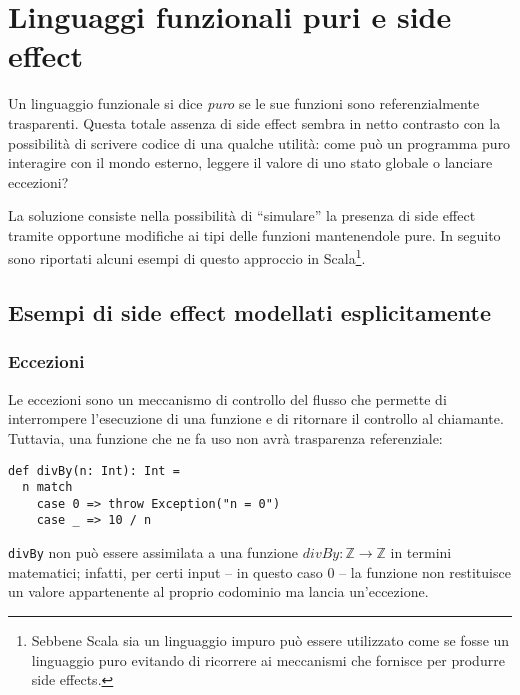 \section{Linguaggi funzionali puri e side effect}
\label{linguaggi-funzionali-puri-e-side-effect}

Un linguaggio funzionale si dice \emph{puro} se le sue funzioni sono referenzialmente trasparenti.
Questa totale assenza di side effect sembra in netto contrasto con la possibilità di scrivere codice di una qualche utilità: come può un programma puro interagire con il mondo esterno, leggere il valore di uno stato globale o lanciare eccezioni?

La soluzione consiste nella possibilità di ``simulare'' la presenza di side effect tramite opportune modifiche ai tipi delle funzioni mantenendole pure.
In seguito sono riportati alcuni esempi di questo approccio in Scala\footnote{Sebbene Scala sia un linguaggio impuro può essere utilizzato come se fosse un linguaggio puro evitando di ricorrere ai meccanismi che fornisce per produrre side effects.}.

\subsection{Esempi di side effect modellati esplicitamente}
\subsubsection{Eccezioni}
\label{eccezioni}
Le eccezioni sono un meccanismo di controllo del flusso che permette di interrompere l'esecuzione di una funzione e di ritornare il controllo al chiamante.
Tuttavia, una funzione che ne fa uso non avrà trasparenza referenziale:
\begin{lstlisting}[language=scala3]
def divBy(n: Int): Int =
  n match
    case 0 => throw Exception("n = 0")
    case _ => 10 / n
\end{lstlisting}
\lstinline|divBy| non può essere assimilata a una funzione $divBy : \mathbb{Z} \rightarrow \mathbb{Z}$ in termini matematici; infatti, per certi input -- in questo caso 0 -- la funzione non restituisce un valore appartenente al proprio codominio ma lancia un'eccezione.

